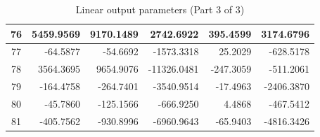 \documentclass[12pt]{article}
\begin{document}
\begin{table}[H]
\begin{tabular}{|c|r|r|r|r|r|}
76 & 5459.9569 & 9170.1489 & 2742.6922 & 395.4599 & 3174.6796 \\ \hline
77 & -64.5877 & -54.6692 & -1573.3318 & 25.2029 & -628.5178 \\ \hline
78 & 3564.3695 & 9654.9076 & -11326.0481 & -247.3059 & -511.2061 \\ \hline
79 & -164.4758 & -264.7401 & -3540.9514 & -17.4963 & -2406.3870 \\ \hline
80 & -45.7860 & -125.1566 & -666.9250 & 4.4868 & -467.5412 \\ \hline
81 & -405.7562 & -930.8996 & -6960.9643 & -65.9403 & -4816.3426 \\ \hline
\end{tabular}
\label{tab:linearBa3}
\caption{Linear output parameters (Part 3 of 3)}
\end{table}
\end{document}
